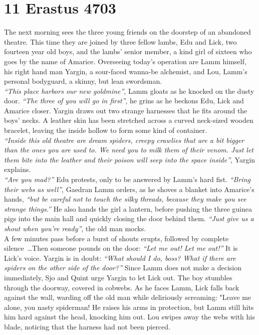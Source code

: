 \section{11 Erastus 4703}

The next morning sees the three young friends on the doorstep of an abandoned theatre. This time they are joined by three fellow lambs, Edu and Lick, two fourteen year old boys, and the lambs' senior member, a kind girl of sixteen who goes by the name of Amarice. Overseeing today's operation are Lamm himself, his right hand man Yargin, a sour-faced wanna-be alchemist, and Lou, Lamm's personal bodyguard, a skinny, but lean swordsman.\\

{\itshape ``This place harbors our new goldmine''}, Lamm gloats as he knocked on the dusty door. {\itshape ``The three of you will go in first''}, he grins as he beckons Edu, Lick and Amarice closer. Yargin draws out two strange harnesses that he fits around the boys' necks. A leather skin has been stretched across a curved neck-sized wooden bracelet, leaving the inside hollow to form some kind of container.\\

{\itshape ``Inside this old theatre are dream spiders, creepy crawlies that are a bit bigger than the ones you are used to. We need you to milk them of their venom. Just let them bite into the leather and their poison will seep into the space inside''}, Yargin explains.\\

{\itshape ``Are you mad?''} Edu protests, only to be answered by Lamm's hard fist. {\itshape ``Bring their webs as well''}, Gaedran Lamm orders, as he shoves a blanket into Amarice's hands, {\itshape ``but be careful not to touch the silky threads, because they make you see strange things.''} He also hands the girl a lantern, before pushing the three guinea pigs into the main hall and quickly closing the door behind them. {\itshape ``Just give us a shout when you're ready''}, the old man mocks.\\

A few minutes pass before a burst of shouts erupts, followed by complete silence~\ldots Then someone pounds on the door: {\itshape ``Let me out! Let me out!''} It is Lick's voice. Yargin is in doubt: {\itshape ``What should I do, boss? What if there are spiders on the other side of the door?''} Since Lamm does not make a decision immediately, Sjo and Quint urge Yargin to let Lick out. The boy stumbles through the doorway, covered in cobwebs. As he faces Lamm, Lick falls back against the wall, warding off the old man while deliriously screaming: "Leave me alone, you nasty spiderman! He raises his arms in protection, but Lamm still hits him hard against the head, knocking him out. Lou swipes away the webs with his blade, noticing that the harness had not been pierced.\\

